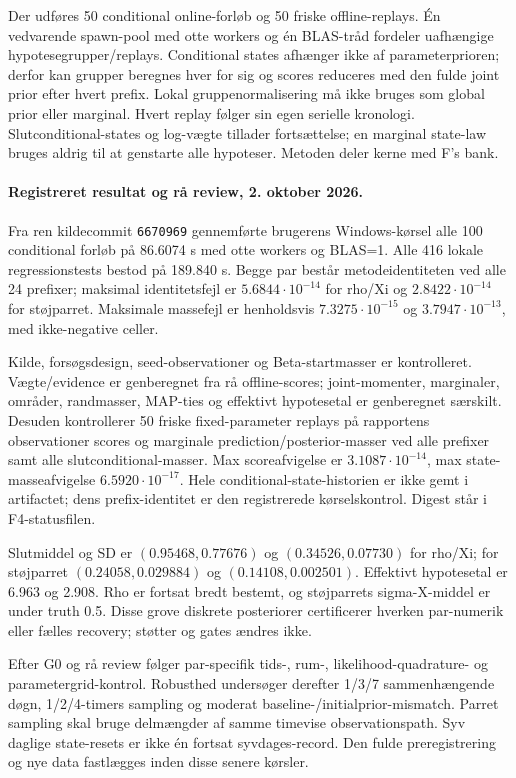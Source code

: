 Der udføres 50 conditional online-forløb og 50 friske offline-replays.
Én vedvarende spawn-pool med otte workers og én BLAS-tråd fordeler uafhængige
hypotesegrupper/replays. Conditional states afhænger ikke af parameterprioren;
derfor kan grupper beregnes hver for sig og scores reduceres med den fulde
joint prior efter hvert prefix. Lokal gruppenormalisering må ikke bruges som
global prior eller marginal. Hvert replay følger sin egen serielle kronologi.
Slutconditional-states og log-vægte tillader fortsættelse; en marginal state-law
bruges aldrig til at genstarte alle hypoteser. Metoden deler kerne med F's bank.

\paragraph{Registreret resultat og rå review, 2. oktober 2026.}
Fra ren kildecommit \texttt{6670969} gennemførte brugerens Windows-kørsel
alle 100 conditional forløb på 86.6074 s med otte workers og BLAS=1.
Alle 416 lokale regressionstests bestod på 189.840 s. Begge par består
metodeidentiteten ved alle 24 prefixer; maksimal identitetsfejl er
\(5.6844\cdot10^{-14}\) for rho/Xi og \(2.8422\cdot10^{-14}\) for støjparret.
Maksimale massefejl er henholdsvis \(7.3275\cdot10^{-15}\) og
\(3.7947\cdot10^{-13}\), med ikke-negative celler.

Kilde, forsøgsdesign, seed-observationer og Beta-startmasser er kontrolleret.
Vægte/evidence er genberegnet fra rå offline-scores; joint-momenter, marginaler,
områder, randmasser, MAP-ties og effektivt hypotesetal er genberegnet særskilt.
Desuden kontrollerer 50 friske fixed-parameter replays på rapportens observationer
scores og marginale prediction/posterior-masser ved alle prefixer samt alle
slutconditional-masser. Max scoreafvigelse er \(3.1087\cdot10^{-14}\),
max state-masseafvigelse \(6.5920\cdot10^{-17}\).
Hele conditional-state-historien er ikke gemt i artifactet; dens prefix-identitet
er den registrerede kørselskontrol. Digest står i F4-statusfilen.

Slutmiddel og SD er \((0.95468,0.77676)\) og \((0.34526,0.07730)\)
for rho/Xi; for støjparret \((0.24058,0.029884)\) og \((0.14108,0.002501)\).
Effektivt hypotesetal er 6.963 og 2.908. Rho er fortsat bredt bestemt, og
støjparrets sigma-X-middel er under truth 0.5. Disse grove diskrete posteriorer
certificerer hverken par-numerik eller fælles recovery; støtter og gates ændres ikke.

Efter G0 og rå review følger par-specifik tids-, rum-, likelihood-quadrature-
og parametergrid-kontrol. Robusthed undersøger derefter 1/3/7 sammenhængende
døgn, 1/2/4-timers sampling og moderat baseline-/initialprior-mismatch.
Parret sampling skal bruge delmængder af samme timevise observationspath.
Syv daglige state-resets er ikke én fortsat syvdages-record. Den fulde
preregistrering og nye data fastlægges inden disse senere kørsler.

